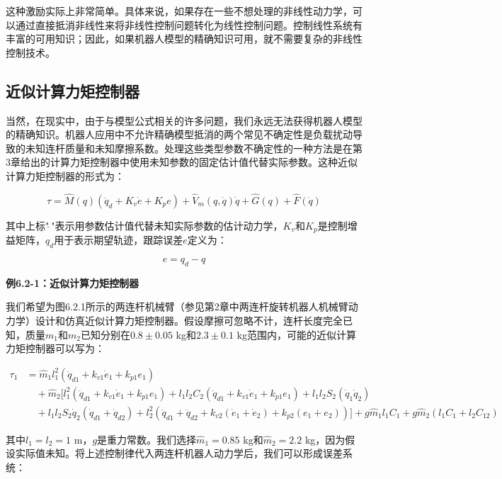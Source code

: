 \documentclass[12pt,a4paper]{ctexart}
\begin{document}
这种激励实际上非常简单。具体来说，如果存在一些不想处理的非线性动力学，可以通过直接抵消非线性来将非线性控制问题转化为线性控制问题。控制线性系统有丰富的可用知识；因此，如果机器人模型的精确知识可用，就不需要复杂的非线性控制技术。

\subsection*{近似计算力矩控制器}

当然，在现实中，由于与模型公式相关的许多问题，我们永远无法获得机器人模型的精确知识。机器人应用中不允许精确模型抵消的两个常见不确定性是负载扰动导致的未知连杆质量和未知摩擦系数。处理这些类型参数不确定性的一种方法是在第3章给出的计算力矩控制器中使用未知参数的固定估计值代替实际参数。这种近似计算力矩控制器的形式为：

\begin{equation}\label{eq:approx-computed-torque}
\tau = \hat{M}(q)(\ddot{q}_d + K_v \dot{e} + K_p e) + \hat{V}_m(q, \dot{q})\dot{q} + \hat{G}(q) + \hat{F}(\dot{q})
\end{equation}

其中上标"$\hat{\ }$"表示用参数估计值代替未知实际参数的估计动力学，$K_v$和$K_p$是控制增益矩阵，$q_d$用于表示期望轨迹，跟踪误差$e$定义为：

\begin{equation}
e = q_d - q
\end{equation}

\textbf{例6.2-1：近似计算力矩控制器}

我们希望为图6.2.1所示的两连杆机械臂（参见第2章中两连杆旋转机器人机械臂动力学）设计和仿真近似计算力矩控制器。假设摩擦可忽略不计，连杆长度完全已知，质量$m_1$和$m_2$已知分别在$0.8 \pm 0.05$ kg和$2.3 \pm 0.1$ kg范围内，可能的近似计算力矩控制器可以写为：

\begin{align}
\tau_1 &= \hat{m}_1 l_1^2 (\ddot{q}_{d1} + k_{v1} \dot{e}_1 + k_{p1} e_1) \\
&\quad + \hat{m}_2 [l_1^2 (\ddot{q}_{d1} + k_{v1} \dot{e}_1 + k_{p1} e_1) + l_1 l_2 C_2 (\ddot{q}_{d1} + k_{v1} \dot{e}_1 + k_{p1} e_1) + l_1 l_2 S_2 (\dot{q}_1 \dot{q}_2) \\ &\quad + l_1 l_2 S_2 \dot{q}_2 (\dot{q}_{d1} + \dot{q}_{d2}) + l_2^2 (\ddot{q}_{d1} + \ddot{q}_{d2} + k_{v2} (\dot{e}_1 + \dot{e}_2) + k_{p2} (e_1 + e_2))] + g \hat{m}_1 l_1 C_1 + g \hat{m}_2 (l_1 C_1 + l_2 C_{12})
\end{align}

其中$l_1 = l_2 = 1$ m，$g$是重力常数。我们选择$\hat{m}_1 = 0.85$ kg和$\hat{m}_2 = 2.2$ kg，因为假设实际值未知。将上述控制律代入两连杆机器人动力学后，我们可以形成误差系统：
\end{document}
